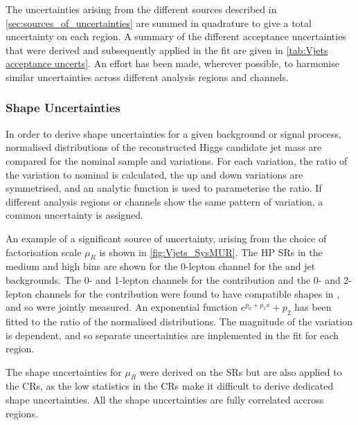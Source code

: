 %
The uncertainties arising from the different sources described in \cref{sec:sources_of_uncertainties} are summed in quadrature to give a total uncertainty on each region.
A summary of the different acceptance uncertainties that were derived and subsequently applied in the fit are given in \cref{tab:Vjets acceptance uncerts}.
An effort has been made, wherever possible, to harmonise similar uncertainties across different analysis regions and channels.



\subsubsection{\Vjets Shape Uncertainties}

In order to derive shape uncertainties for a given background or signal process, normalised distributions of the reconstructed \largeR Higgs candidate jet mass \mJ are compared for the nominal sample and variations.
For each variation, the ratio of the variation to nominal is calculated, the up and down variations are symmetrised, and an analytic function is used to parameterise the ratio.
If different analysis regions or channels show the same pattern of variation, a common uncertainty is assigned.

An example of a significant source of uncertainty, arising from the choice of factorisation scale $\mu_R$ is shown in \cref{fig:Vjets_SysMUR}.
The HP SRs in the medium and high \pTV bins are shown for the 0-lepton channel for the \Whf and \Zhf jet backgrounds.
The 0- and 1-lepton channels for the \Whf contribution and the 0- and 2-lepton channels for the \Zjets contribution were found to have compatible shapes in \mJ, and so were jointly measured.
An exponential function $e^{p_0+p_1x}+p_2$ has been fitted to the ratio of the normalised distributions.
The magnitude of the variation is \ptv dependent, and so separate uncertainties are implemented in the fit for each \pTV region. 

The shape uncertainties for $\mu_R$ were derived on the SRs but are also applied to the CRs, as the low statistics in the CRs make it difficult to derive dedicated shape uncertainties.
All the shape uncertainties are fully correlated accross regions.

